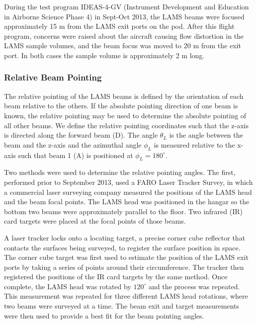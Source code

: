 \documentclass[12pt,twoside,english]{article}\usepackage[]{graphicx}\usepackage[]{color}
\let\OrgIndex\index
\renewcommand*{\index}[1]{\OrgIndex{#1}}
\begin{document}
{{During the test program IDEAS-4-GV (Instrument Development and Education in Airborne Science Phase 4) in Sept-Oct 2013, the LAMS beams were focused approximately 15 m from the LAMS exit ports on the pod. After this flight program, concerns were raised about the aircraft causing flow distortion in the LAMS sample  volumes, and the beam focus was moved to 20 m from the exit port. In both cases the sample volume is approximately 2 m long. 

\subsubsection{Relative Beam Pointing}

The relative pointing of the LAMS beams is defined by the orientation of each beam relative to the others. If the absolute pointing direction of one beam is known, the relative pointing may be used to determine the absolute pointing of all other beams. We define the relative pointing coordinates such that the z-axis is directed along the forward beam (D). The angle $\theta_{L}$ is the angle between the beam and the z-axis and the azimuthal angle $\phi_{L}$ is measured relative to the x-axis such that beam 1 (A) is positioned at $\phi_{L}=180^{\circ}$.

Two methods were used to determine the relative pointing angles. The first, performed prior to September 2013, used a FARO Laser Tracker Survey, in which a commercial laser surveying company measured the positions of the LAMS head and the beam focal points. The 
LAMS head was positioned in the hangar so the bottom two beams were approximately parallel to the floor. Two infrared (IR) card targets were placed at the focal points of those beams. 

A laser tracker locks onto a locating target, a precise corner cube reflector that contacts the surfaces being surveyed, to register the surface
position in space. The corner cube target was first used to estimate the position of the LAMS exit ports by taking a series of points around their circumference. The tracker then registered the positions of the IR card targets by the same method. Once complete, the LAMS head was rotated by $120^{\circ}$ and the process was repeated. This measurement was repeated for three different LAMS head rotations, where two beams were surveyed at a time. 
The beam exit and target measurements were then used to provide a best fit for the beam pointing angles. 

}}
\end{document}
